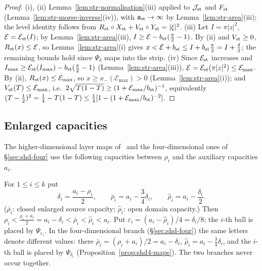 \begin{proof}
(i), (ii) Lemma~\ref{lem:str-normalisation}(iii) applied to $\mathcal J_{\rm st}$ and $F_{\rm st}$ (Lemma~\ref{lem:str-morse-inverse}(iv)), with $\mathfrak a_{\rm st}\to\infty$ by Lemma~\ref{lem:str-area}(iii); the level identity follows from $R_{\rm st}\circ X_{\rm st}+V_{\rm st}\circ Y_{\rm st}=|\xi|^2$.
(iii) Let $I=\pi|z|^2$, $\mathcal E=\mathcal E_{\rm st}(I)$; by Lemma~\ref{lem:str-area}(iii), $I\ge\mathcal E-b_{\rm st}(\frac\pi2-1)$. By (ii) and $V_{\rm st}\ge0$, $R_{\rm st}(x)\le\mathcal E$, so Lemma~\ref{lem:str-area}(i) gives $x<\mathcal E+b_{\rm st}\le I+b_{\rm st}\tfrac\pi2=I+\tfrac\delta2$; the remaining bounds hold since $\Psi_\delta$ maps into the strip.
(iv) Since $\mathcal E_{\rm st}$ increases and $I_{\max}\ge\mathcal E_{\rm st}(I_{\max})-b_{\rm st}(\frac\pi2-1)$ (Lemma~\ref{lem:str-area}(iii)), $\mathcal E=\mathcal E_{\rm st}(\pi|z|^2)\le\mathcal E_{\max}$. By (ii), $R_{\rm st}(x)\le\mathcal E_{\max}$, so $x\ge x_-(\mathcal E_{\max})>0$ (Lemma~\ref{lem:str-area}(i)); and $V_{\rm st}(T)\le\mathcal E_{\max}$, i.e.\ $2\sqrt{T(1-T)}\ge(1+\mathcal E_{\max}/b_{\rm st})^{-1}$, equivalently $(T-\frac12)^2=\frac14-T(1-T)\le\frac14[1-(1+\mathcal E_{\max}/b_{\rm st})^{-2}]$.
\end{proof}

\subsection{Enlarged capacities}\label{sec:str-balls}

The higher-dimensional layer maps of~\cite{SongHD} and the four-dimensional ones of \S\ref{sec:shd-four} use the
following capacities between $\rho_i$ and the auxiliary capacities $a_i$.

\begin{definition}\label{def:str-enlarged}
For $1\le i\le k$ put
\[
 \delta_i=\frac{a_i-\rho_i}2,\qquad
 \bar\rho_i=a_i-\frac34\delta_i,\qquad \hat\rho_i=a_i-\frac{\delta_i}2 .
\]
($\bar\rho_i$: closed enlarged source capacity; $\hat\rho_i$: open domain capacity.) Then
$\rho_i<\frac{\rho_i+a_i}2=a_i-\delta_i<\bar\rho_i<\hat\rho_i<a_i$. Put
$\varepsilon_i=(a_i-\hat\rho_i)/4=\delta_i/8$; the $i$-th ball is placed by $\Psi_{\varepsilon_i}$.
In the four-dimensional branch (\S\ref{sec:shd-four}) the same letters denote different values:
there $\bar\rho_i=(\rho_i+a_i)/2=a_i-\delta_i$, $\hat\rho_i=a_i-\frac34\delta_i$, and the $i$-th ball is placed by
$\Psi_{\delta_i}$ (Proposition~\ref{prop:shd4-maps}). The two branches never occur together.
\end{definition}
